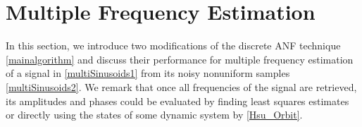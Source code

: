 \documentclass{UCF_ETD}
\begin{document}





\section {Multiple Frequency Estimation} \label{sec:mult}
\label{mfe.section}

In this section, we introduce  two  modifications of the discrete ANF technique \eqref{mainalgorithm}
and discuss their performance for multiple frequency estimation
of a signal in  \eqref{multiSinusoids1}
from its noisy nonuniform samples \eqref{multiSinusoids2}.
 We remark that once all frequencies of the signal are retrieved,
 its amplitudes and phases could be evaluated  by  finding least squares estimates \cite{abbas13} or
 directly using the states of some dynamic system by \eqref{Hsu_Orbit}.
\end{document}
